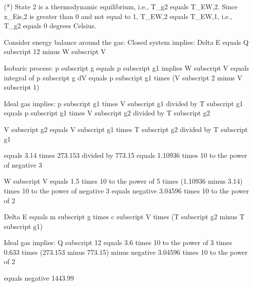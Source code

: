 (*) State 2 is a thermodynamic equilibrium, i.e., T_g2 equals T_EW,2.  
Since x_Eis,2 is greater than 0 and not equal to 1, T_EW,2 equals T_EW,1, i.e., T_g2 equals 0 degrees Celsius.

Consider energy balance around the gas:  
Closed system implies:  
Delta E equals Q subscript 12 minus W subscript V  

Isobaric process: p subscript g equals p subscript g1 implies W subscript V equals integral of p subscript g dV  
equals p subscript g1 times (V subscript 2 minus V subscript 1)  

Ideal gas implies:  
p subscript g1 times V subscript g1 divided by T subscript g1 equals p subscript g1 times V subscript g2 divided by T subscript g2  

V subscript g2 equals V subscript g1 times T subscript g2 divided by T subscript g1  

equals 3.14 times 273.153 divided by 773.15  
equals 1.10936 times 10 to the power of negative 3  

W subscript V equals 1.5 times 10 to the power of 5 times (1.10936 minus 3.14) times 10 to the power of negative 3  
equals negative 3.04596 times 10 to the power of 2  

Delta E equals m subscript g times c subscript V times (T subscript g2 minus T subscript g1)  

Ideal gas implies:  
Q subscript 12 equals 3.6 times 10 to the power of 3 times 0.633 times (273.153 minus 773.15)  
minus negative 3.04596 times 10 to the power of 2  

equals negative 1443.99